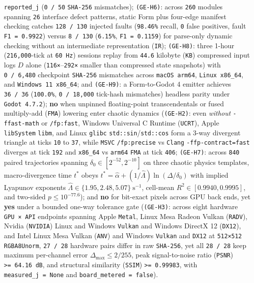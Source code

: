 \documentclass[10pt,letterpaper]{article}
\begin{document}
\texttt{reported\_\allowbreak{}j} (\texttt{0\ /\ 50} \texttt{SHA-256} mismatches);
\texttt{(GE-H6)}: across \texttt{260} modules spanning \texttt{26}
interface defect patterns, static Form plus four-edge manifest checking
catches \texttt{128\ /\allowbreak{}\ 130} injected faults (\texttt{98.46\%} recall,
\texttt{0} false positives, fault \texttt{F1\ =\ 0.\allowbreak{}9922}) versus
\texttt{8\ /\ 130} (\texttt{6.15\%}, \texttt{F1\ =\ 0.\allowbreak{}1159}) for
parse-only dynamic checking without an intermediate representation
(\texttt{IR}); \texttt{(GE-H8)}: three 1-hour (\texttt{216,000}-tick at
\texttt{60\ Hz}) sessions replay from \texttt{44.6} kilobyte
(\texttt{KB}) compressed input logs \(D\) alone
(\texttt{116×}--\texttt{292×} smaller than compressed state snapshots)
with \texttt{0\ /\allowbreak{}\ 6,\allowbreak{}480} checkpoint \texttt{SHA-256} mismatches across
\texttt{macOS\ arm64}, \texttt{Linux\ x86\_\allowbreak{}64}, and
\texttt{Windows\ 11\ x86\_\allowbreak{}64}; and \texttt{(GE-H9)}: a Form-to-Godot 4
emitter achieves \texttt{36\ /\ 36} (\texttt{100.0\%},
\texttt{0\ /\allowbreak{}\ 18,\allowbreak{}000} tick-hash mismatches) headless parity under
\texttt{Godot\ 4.\allowbreak{}7.\allowbreak{}2}); \textbf{no} when unpinned floating-point
transcendentals or fused multiply-add (\texttt{FMA}) lowering enter
chaotic dynamics (\texttt{(GE-H2)}: even \emph{without}
\texttt{-\allowbreak{}ffast-\allowbreak{}math} or \texttt{/fp:fast}, Windows Universal C Runtime
(\texttt{UCRT}), Apple \texttt{libSystem} \texttt{libm}, and Linux
\texttt{glibc} \texttt{std::sin}/\allowbreak{}\texttt{std::cos} form a 3-way
divergent triangle at ticks \texttt{10} to \texttt{37}, while
\texttt{MSVC} \texttt{/\allowbreak{}fp:precise} vs \texttt{Clang}
\texttt{-\allowbreak{}ffp-\allowbreak{}contract=fast} diverges at tick \texttt{192} and
\texttt{x86\_64} vs \texttt{arm64} \texttt{FMA} at tick \texttt{406};
\texttt{(GE-H7)}: across \texttt{840} paired trajectories spanning
\(\delta_0 \in [2^{-52}, 2^{-10}]\) on three chaotic physics templates,
macro-divergence time \(t^*\) obeys
\(t^* = \hat{\alpha} + (1/\hat{\Lambda})\ln(\Delta/\delta_0)\) with
implied Lyapunov exponents
\(\hat{\Lambda} \in \{1.95, 2.48, 5.07\}\ \text{s}^{-1}\), cell-mean
\(R^2 \in [0.9940, 0.9995]\), and two-sided \(p \le 10^{-77.6}\)); and
\textbf{no} for bit-exact pixels across GPU back ends, yet \textbf{yes}
under a bounded one-way tolerance gate (\texttt{(GE-H3)}: across eight
hardware \texttt{GPU\ ×\ API} endpoints spanning Apple \texttt{Metal},
Linux Mesa Radeon Vulkan (\texttt{RADV}), Nvidia (\texttt{NVIDIA}) Linux
and Windows \texttt{Vulkan} and Windows DirectX 12 (\texttt{DX12}), and
Intel Linux Mesa Vulkan (\texttt{ANV}) and Windows \texttt{Vulkan} and
\texttt{DX12} at \texttt{512×512} \texttt{RGBA8Unorm},
\texttt{27\ /\ 28} hardware pairs differ in raw \texttt{SHA-256}, yet
all \texttt{28\ /\ 28} keep maximum per-channel error
\(\Delta_{\max} \le 2 / 255\), peak signal-to-noise ratio
(\texttt{PSNR}) \texttt{\textgreater{}=\ 64.16\ dB}, and structural
similarity (\texttt{SSIM}) \texttt{\textgreater{}=\ 0.99983}, with
\texttt{measured\_\allowbreak{}j\ =\ None} and \texttt{board\_\allowbreak{}metered\ =\ false}).
\end{document}

